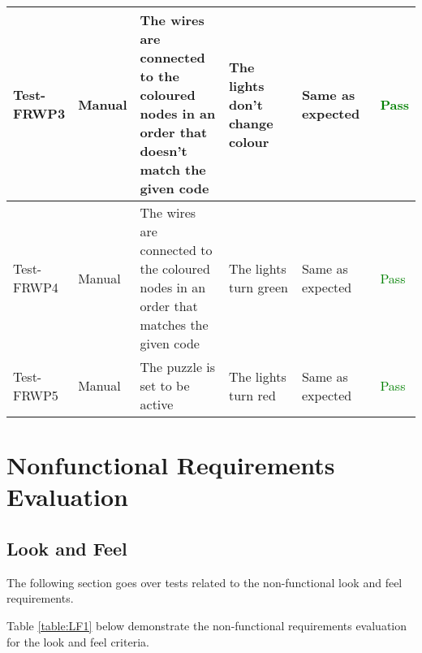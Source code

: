 \documentclass[12pt, titlepage]{article}
\begin{document}
\begin{table}[H]
{\begin{tabular}{|l|p{0.15\linewidth}|p{0.3\linewidth}|p{0.3\linewidth}|p{0.3\linewidth}|p{0.1\linewidth}|}
\hline
Test-FRWP3 & Manual & The wires are connected to the coloured nodes in an order that doesn’t match the given code & The lights don’t change colour & Same as expected & \textcolor{Green}{Pass} \\
\hline
Test-FRWP4 & Manual & The wires are connected to the coloured nodes in an order that matches the given code & The lights turn green & Same as expected & \textcolor{Green}{Pass} \\
\hline
Test-FRWP5 & Manual & The puzzle is set to be active & The lights turn red & Same as expected & \textcolor{Green}{Pass} \\
\hline
\end{tabular}}
\label{table:MS1}
\end{table}


\section{Nonfunctional Requirements Evaluation}

\subsection{Look and Feel}
The following section goes over tests related to the non-functional look and feel requirements.


Table \ref{table:LF1} below demonstrate the non-functional requirements evaluation for the look and feel criteria.
\end{document}
